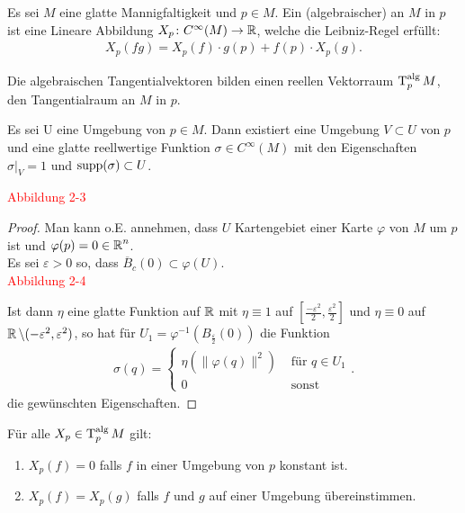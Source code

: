 \begin{Dfn}
  Es sei $M$ eine glatte Mannigfaltigkeit und $p\in M$. Ein (algebraischer)  an $M$ in $p$ ist eine Lineare Abbildung $X_p \colon C^{\infty}(M) \to \operatorname{\mathbb{R}}$, welche die Leibniz-Regel erfüllt:
  \begin{align*}
    X_p(fg) = X_p(f) \cdot g(p) + f(p) \cdot X_p(g).
  \end{align*}

  Die algebraischen Tangentialvektoren bilden einen reellen Vektorraum $\operatorname{T}_p^{\text{alg}}M$, den Tangentialraum an $M$ in $p$.
\end{Dfn}

\begin{Lemma}
  Es sei U eine Umgebung von $p \in M$. Dann existiert eine Umgebung $V \subset U$ von $p$ und eine glatte reellwertige Funktion $\sigma \in C^{\infty}(M)$ mit den Eigenschaften $\sigma|_V = 1$ und $\operatorname{supp}(\sigma) \subset U$.
\end{Lemma}

\textcolor{red}{Abbildung 2-3}


\begin{proof}
  Man kann o.E. annehmen, dass $U$ Kartengebiet einer Karte $\varphi$ von $M$ um $p$ ist und $\varphi(p) = 0 \in \operatorname{\mathbb{R}}^n$.\\

  Es sei $\varepsilon > 0$ so, dass $\overline B_c(0) \subset \varphi(U)$. \\

  \textcolor{red}{Abbildung 2-4}

  Ist dann $\eta$ eine glatte Funktion auf $\operatorname{\mathbb{R}}$ mit $\eta \equiv 1$ auf $\left[\frac{-\varepsilon^{2}}{2},\frac{\varepsilon^2}{2}\right]$ und $\eta \equiv 0$ auf $\operatorname{\mathbb{R}} \setminus (-\varepsilon^2,\varepsilon^2)$, so hat für $U_1 = \varphi^{-1}(B_{\frac{\varepsilon}{2}}(0))$ die Funktion
  \begin{align*}
    \sigma(q) =
    \begin{cases}
      \eta(\|\varphi(q)\|^2) & \text{ für } q \in U_1\\
      0 & \text{ sonst }
    \end{cases}.
  \end{align*}
  die gewünschten Eigenschaften.
\end{proof}

\begin{Lemma}
Für alle $X_p\in\operatorname{T}_p^{\text{alg}}M$ gilt:
\begin{enumerate}[label=(\roman*),widest=ii]
\item $X_p(f) = 0$ falls $f$ in einer Umgebung von $p$ konstant ist.
\item $X_p(f) = X_p(g)$ falls $f$ und $g$ auf einer Umgebung übereinstimmen.
\end{enumerate}
\end{Lemma}

